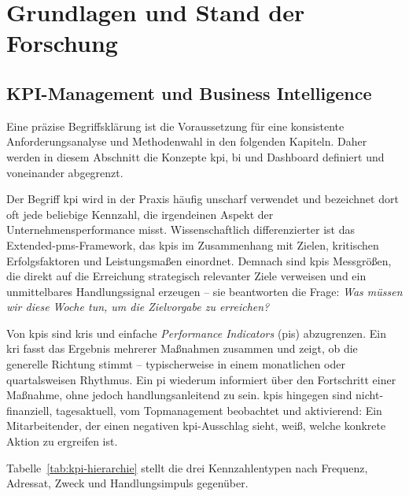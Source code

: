 \section{Grundlagen und Stand der Forschung}

\subsection{KPI-Management und Business Intelligence}
\label{sec:grundlagen-kpi-bi}

Eine präzise Begriffsklärung ist die Voraussetzung für eine konsistente Anforderungsanalyse und Methodenwahl in den folgenden Kapiteln.
Daher werden in diesem Abschnitt die Konzepte \gls{kpi}, \gls{bi} und Dashboard definiert und voneinander abgegrenzt.

Der Begriff \gls{kpi} wird in der Praxis häufig unscharf verwendet und bezeichnet dort oft jede beliebige Kennzahl, die irgendeinen Aspekt der Unternehmensperformance misst.
Wissenschaftlich differenzierter ist das Extended-\gls{pms}-Framework, das \glspl{kpi} im Zusammenhang mit Zielen, kritischen Erfolgsfaktoren und Leistungsmaßen einordnet.
Demnach sind \glspl{kpi} Messgrößen, die direkt auf die Erreichung strategisch relevanter Ziele verweisen und ein unmittelbares Handlungssignal erzeugen -- sie beantworten die Frage: \textit{Was müssen wir diese Woche tun, um die Zielvorgabe zu erreichen?}

Von \glspl{kpi} sind \glspl{kri} und einfache \textit{Performance Indicators} (\glspl{pi}) abzugrenzen.
Ein \gls{kri} fasst das Ergebnis mehrerer Maßnahmen zusammen und zeigt, ob die generelle Richtung stimmt -- typischerweise in einem monatlichen oder quartalsweisen Rhythmus.
Ein \gls{pi} wiederum informiert über den Fortschritt einer Maßnahme, ohne jedoch handlungsanleitend zu sein.
\glspl{kpi} hingegen sind nicht-finanziell, tagesaktuell, vom Topmanagement beobachtet und aktivierend: Ein Mitarbeitender, der einen negativen \gls{kpi}-Ausschlag sieht, weiß, welche konkrete Aktion zu ergreifen ist.

Tabelle~\ref{tab:kpi-hierarchie} stellt die drei Kennzahlentypen nach Frequenz, Adressat, Zweck und Handlungsimpuls gegenüber.

